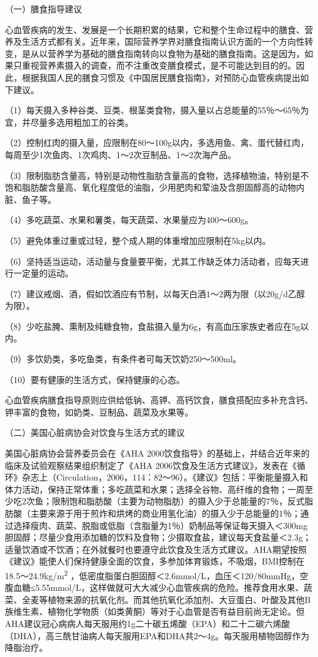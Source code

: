 （一）膳食指导建议

心血管疾病的发生、发展是一个长期积累的结果，它和整个生命过程中的膳食、营养及生活方式都有关。近年来，国际营养学界对膳食指南认识方面的一个方向性转变，是从以营养学为基础的膳食指南转向以食物为基础的膳食指南。这是因为，如果只重视营养素摄入的调查，而不注重改变膳食模式，是不可能达到目的的。因此，根据我国人民的膳食习惯及《中国居民膳食指南》，对预防心血管疾病提出如下建议。

（1）每天摄入多种谷类、豆类、根茎类食物，摄入量以占总能量的55％～65％为宜，并尽量多选用粗加工的谷类。

（2）控制红肉的摄入量，应限制在80～100g以内，多选用鱼、禽、蛋代替红肉，每周至少1次鱼肉、1次鸡肉、1～2次豆制品、1～2次海产品。

（3）限制脂肪含量高，特别是动物性脂肪含量高的食物，选择植物油，特别是不饱和脂肪酸含量高、氧化程度低的油脂，少用肥肉和荤油及含胆固醇高的动物内脏、鱼子等。

（4）多吃蔬菜、水果和薯类，每天蔬菜、水果量应为400～600g。

（5）避免体重过重或过轻，整个成人期的体重增加应限制在5kg以内。

（6）坚持适当运动，活动量与食量要平衡，尤其工作缺乏体力活动者，应每天进行一定量的运动。

（7）建议戒烟、酒，假如饮酒应有节制，以每天白酒1～2两为限（以20g/d乙醇为限）。

（8）少吃盐腌、熏制及纯糖食物，食盐摄入量为6g，有高血压家族史者应在5g以内。

（9）多饮奶类，多吃鱼类，有条件者可每天饮奶250～500ml。

（10）要有健康的生活方式，保持健康的心态。

心血管疾病膳食指导原则应供给低钠、高钾、高钙饮食，膳食搭配应多补充含钙、钾丰富的食物，如奶类、豆制品、蔬菜及水果等。

（二）美国心脏病协会对饮食与生活方式的建议

美国心脏病协会营养委员会在《AHA
2000饮食指导》的基础上，并结合近年来的临床及试验观察结果组织制定了《AHA
2006饮食及生活方式建议》，发表在《循环》杂志上（Circulation，2006，114：82～96）。《建议》包括：平衡能量摄入和体力活动，保持正常体重；多吃蔬菜和水果；选择全谷物、高纤维的食物；一周至少吃2次鱼；限制饱和脂肪酸（主要为动物脂肪）的摄入少于总能量的7％，反式脂肪酸（主要来源于用于煎炸和烘烤的商业用氢化油）的摄入少于总能量的1％；通过选择瘦肉、蔬菜、脱脂或低脂（含脂量为1％）奶制品等保证每天摄入＜300mg胆固醇；尽量少食用添加糖的饮料及食物；少摄取食盐，建议每天食盐量＜2.3g；适量饮酒或不饮酒；在外就餐时也要遵守此饮食及生活方式建议。AHA期望按照《建议》能使人们保持健康全面的饮食，多参加体育锻炼，不吸烟，BMI控制在18.5～24.9kg/m\textsuperscript{2}
，低密度脂蛋白胆固醇＜2.6mmol/L，血压＜120/80mmHg，空腹血糖≤5.55mmol/L，这样做就可大大减少心血管疾病的危险。推荐食用水果、蔬菜、全麦等植物来源的抗氧化剂。而其他抗氧化添加剂、大豆蛋白、叶酸及其他B族维生素、植物化学物质（如类黄酮）等对于心血管是否有益目前尚无定论。但AHA建议冠心病病人每天服用约1g二十碳五烯酸（EPA）和二十二碳六烯酸（DHA），高三酰甘油病人每天服用EPA和DHA共2～4g。每天服用植物固醇作为降脂治疗。

